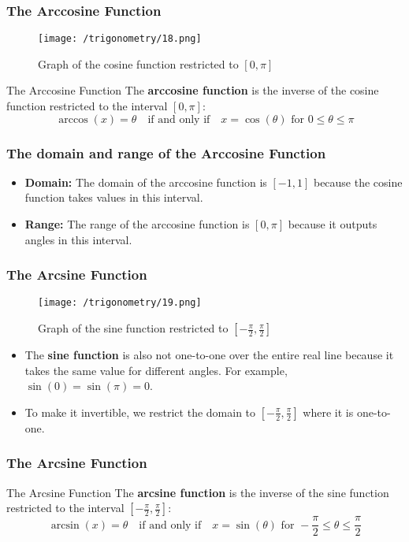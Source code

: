 \documentclass{beamer}
\begin{document}
\begin{frame}
    \frametitle{The Arccosine Function}
    \begin{figure}
        \centering
        \texttt{[image: /trigonometry/18.png]}
        \caption{Graph of the cosine function restricted to \([0, \pi]\)}
    \end{figure}
    \begin{block}{The Arccosine Function}
        The \textbf{arccosine function} is the inverse of the cosine function restricted to the interval \([0, \pi]\):
        \[
        \arccos(x) = \theta \quad \text{if and only if} \quad x = \cos(\theta) \text{ for } 0 \leq \theta \leq \pi
        \]
    \end{block}
\end{frame}

\begin{frame}
\frametitle{The domain and range of the Arccosine Function}
\begin{itemize}
    \item \textbf{Domain:} The domain of the arccosine function is \([-1, 1]\) because the cosine function takes values in this interval.
    \item \textbf{Range:} The range of the arccosine function is \([0, \pi]\) because it outputs angles in this interval.
\end{itemize}       
\end{frame}

\begin{frame}
    \frametitle{The Arcsine Function}
    \begin{figure}
        \centering
        \texttt{[image: /trigonometry/19.png]}
        \caption{Graph of the sine function restricted to \([- \frac{\pi}{2}, \frac{\pi}{2}]\)}
    \end{figure}
    \begin{itemize}
        \item The \textbf{sine function} is also not one-to-one over the entire real line because it takes the same value for different angles. For example, \(\sin(0) = \sin(\pi) = 0\).
        \item To make it invertible, we restrict the domain to \([- \frac{\pi}{2}, \frac{\pi}{2}]\) where it is one-to-one.
    \end{itemize}
\end{frame}

\begin{frame}
    \frametitle{The Arcsine Function}
    \begin{block}{The Arcsine Function}
        The \textbf{arcsine function} is the inverse of the sine function restricted to the interval \([- \frac{\pi}{2}, \frac{\pi}{2}]\):
        \[
        \arcsin(x) = \theta \quad \text{if and only if} \quad x = \sin(\theta) \text{ for } -\frac{\pi}{2} \leq \theta \leq \frac{\pi}{2}
        \]
    \end{block}
\end{frame}
\end{document}

